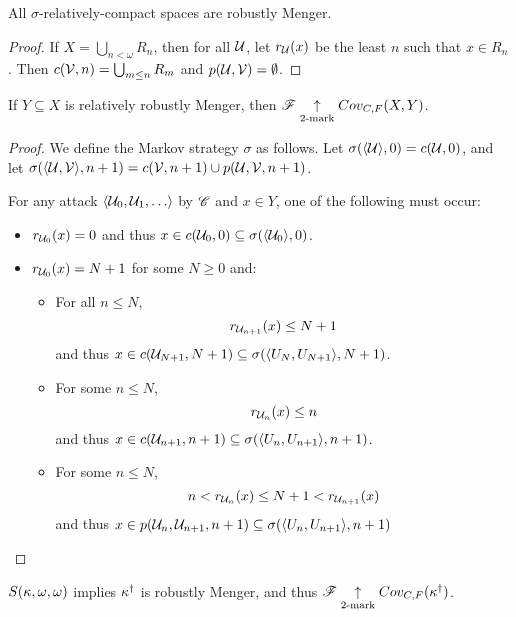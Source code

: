 \begin{prop}
  All $\sigma$-relatively-compact spaces are robustly Menger.
\end{prop}

\begin{proof}
  If $X=\bigcup_{n<\omega}R_n$, then for all $\mathcal{U}$, let $r_{\mathcal{U}}(x)$ be the
  least $n$ such that $x\in R_n$. Then $c(\mathcal{V},n)=\bigcup_{m\leq n}R_m$ and
  $p(\mathcal{U},\mathcal{V}) = \emptyset$.
\end{proof}

\begin{thm}
  If $Y\subseteq X$ is relatively robustly Menger, then
  $\mathscr{F}\underset{2\text{-mark}}{\uparrow}Cov_{C,F}(X,Y)$.
\end{thm}

\begin{proof}
  We define the Markov strategy $\sigma$ as follows.
  Let $\sigma(\langle\mathcal{U}\rangle,0)=c(\mathcal{U},0)$, and let
  $\sigma(\langle\mathcal{U},\mathcal{V}\rangle,n+1)=c(\mathcal{V},n+1)\cup p(\mathcal{U}, \mathcal{V},n+1)$.

  For any attack $\<\mc{U}_0,\mc{U}_1,\dots\>$ by $\mathscr{C}$ and $x\in Y$,
  one of the following must occur:

  \begin{itemize}
    \item
      $r_{\mathcal{U}_0}(x)=0$ and thus
      $x\in c(\mathcal{U}_0,0)\subseteq \sigma(\langle\mathcal{U}_0\rangle,0)$.

    \item
      $r_{\mathcal{U}_0}(x)=N+1$ for some $N\geq 0$ and:
      \begin{itemize}
        \item
          For all $n\leq N$,
          \[
            r_{\mathcal{U}_{n+1}}(x)\leq N+1
          \]
          and thus
          $x\in c(\mathcal{U}_{N+1},N+1) \subseteq
            \sigma(\langle U_N,U_{N+1}\rangle,N+1)$.
        \item
          For some $n \leq N$,
          \[ r_{\mathcal{U}_n}(x)\leq n \]
          and thus
          $x\in c(\mathcal{U}_{n+1},n+1) \subseteq
            \sigma(\langle U_n,U_{n+1}\rangle,n+1)$.
        \item
          For some $n \leq N$,
          \[
            n < r_{\mathcal{U}_n}(x)\leq N+1 < r_{\mathcal{U}_{n+1}}(x)
          \]
         and thus
         $x\in p(\mathcal{U}_n,\mathcal{U}_{n+1},n+1) \subseteq
          \sigma(\langle U_n,U_{n+1}\rangle,n+1)$
       \end{itemize}
  \end{itemize}
\end{proof}

\begin{thm}
  $S(\kappa,\omega,\omega)$ implies $\kappa^\dagger$ is
  robustly Menger, and thus
  $\mathscr{F}\underset{2\text{-mark}}{\uparrow}Cov_{C,F}(\kappa^\dagger)$.
\end{thm}

